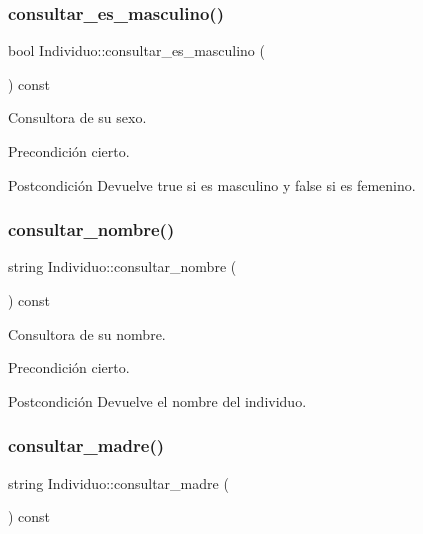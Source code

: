 \subsubsection{\texorpdfstring{consultar\+\_\+es\+\_\+masculino()}{consultar\_es\_masculino()}}
{\footnotesize\ttfamily bool Individuo\+::consultar\+\_\+es\+\_\+masculino (\begin{DoxyParamCaption}{ }\end{DoxyParamCaption}) const}



Consultora de su sexo. 

\begin{DoxyPrecond}{Precondición}
cierto. 
\end{DoxyPrecond}
\begin{DoxyPostcond}{Postcondición}
Devuelve true si es masculino y false si es femenino. 
\end{DoxyPostcond}
\mbox{\label{class_individuo_aa9a26cf22c424ced4ca468af5f203300}} 
\subsubsection{\texorpdfstring{consultar\+\_\+nombre()}{consultar\_nombre()}}
{\footnotesize\ttfamily string Individuo\+::consultar\+\_\+nombre (\begin{DoxyParamCaption}{ }\end{DoxyParamCaption}) const}



Consultora de su nombre. 

\begin{DoxyPrecond}{Precondición}
cierto. 
\end{DoxyPrecond}
\begin{DoxyPostcond}{Postcondición}
Devuelve el nombre del individuo. 
\end{DoxyPostcond}
\mbox{\label{class_individuo_a33f3985445a0e56e09b6bc405c6518f7}} 
\subsubsection{\texorpdfstring{consultar\+\_\+madre()}{consultar\_madre()}}
{\footnotesize\ttfamily string Individuo\+::consultar\+\_\+madre (\begin{DoxyParamCaption}{ }\end{DoxyParamCaption}) const}



